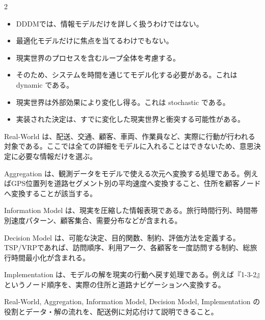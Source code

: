 \begin{multicols}{2}

\footnotesize

\raggedcolumns


\begin{itemize}
\item DDDMでは、情報モデルだけを詳しく扱うわけではない。
\item 最適化モデルだけに焦点を当てるわけでもない。
\item 現実世界のプロセスを含むループ全体を考慮する。
\item そのため、システムを時間を通じてモデル化する必要がある。これは dynamic である。
\item 現実世界は外部効果により変化し得る。これは stochastic である。
\item 実装された決定は、すでに変化した現実世界と衝突する可能性がある。
\end{itemize}

Real-World は、配送、交通、顧客、車両、作業員など、実際に行動が行われる対象である。ここでは全ての詳細をモデルに入れることはできないため、意思決定に必要な情報だけを選ぶ。\par

Aggregation は、観測データをモデルで使える次元へ変換する処理である。例えばGPS位置列を道路セグメント別の平均速度へ変換すること、住所を顧客ノードへ変換することが該当する。\par

Information Model は、現実を圧縮した情報表現である。旅行時間行列、時間帯別速度パターン、顧客集合、需要分布などが含まれる。\par

Decision Model は、可能な決定、目的関数、制約、評価方法を定義する。TSP/VRPであれば、訪問順序、利用アーク、各顧客を一度訪問する制約、総旅行時間最小化が含まれる。\par

Implementation は、モデルの解を現実の行動へ戻す処理である。例えば『1-3-2』というノード順序を、実際の住所と道路ナビゲーションへ変換する。\par

Real-World, Aggregation, Information Model, Decision Model, Implementation の役割とデータ・解の流れを、配送例に対応付けて説明できること。\par


\end{multicols}
